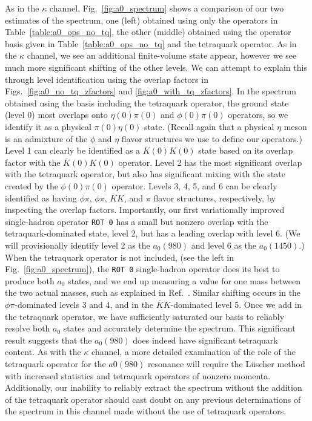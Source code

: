 As in the $\kappa$ channel, Fig.~\ref{fig:a0_spectrum} shows a comparison of our two estimates of the spectrum, one (left) obtained using only the operators in Table~\ref{table:a0_ops_no_tq}, the other (middle) obtained using the operator basis given in Table~\ref{table:a0_ops_no_tq} and the tetraquark operator. As in the $\kappa$ channel, we see an additional finite-volume state appear, however we see much more significant shifting of the other levels. We can attempt to explain this through level identification using the overlap factors in Figs.~\ref{fig:a0_no_tq_zfactors} and \ref{fig:a0_with_tq_zfactors}. In the spectrum obtained using the basis including the tetraquark operator, the ground state (level 0) most overlaps onto $\eta(0)\pi(0)$ and $\phi(0)\pi(0)$ operators, so we identify it as a physical $\pi(0)\eta(0)$ state. (Recall again that a physical $\eta$ meson is an admixture of the $\phi$ and $\eta$ flavor structures we use to define our operators.) Level 1 can clearly be identified as a $\overline K(0) K(0)$ state based on its overlap factor with the $\overline K(0) K(0)$ operator. Level 2 has the most significant overlap with the tetraquark operator, but also has significant mixing with the state created by the $\phi(0)\pi(0)$ operator. Levels 3, 4, 5, and 6 can be clearly identified as having $\phi\pi$, $\phi\pi$, $\overline K K$, and $\pi$ flavor structures, respectively, by inspecting the overlap factors. Importantly, our first variationally improved single-hadron operator \verb+ROT 0+ has a small but nonzero overlap with the tetraquark-dominated state, level 2, but has a leading overlap with level 6. (We will provisionally identify level 2 as the $a_0(980)$ and level 6 as the $a_0(1450)$.) When the tetraquark operator is not included, (see the left in Fig.~\ref{fig:a0_spectrum}), the \verb+ROT 0+ single-hadron operator does its best to produce both $a_0$ states, and we end up measuring a value for one mass between the two actual masses, such as explained in Ref.~\cite{Dudek:2012xn}. Similar shifting occurs in the $\phi\pi$-dominated levels 3 and 4, and in the $\overline K K$-dominated level 5. Once we add in the tetraquark operator, we have sufficiently saturated our basis to reliably resolve both $a_0$ states and accurately determine the spectrum. This significant result suggests that the $a_0(980)$ does indeed have significant tetraquark content. As with the $\kappa$ channel, a more detailed examination of the role of the tetraquark operator for the $a0(980)$ resonance will require the L\"uscher method with increased statistics and tetraquark operators of nonzero momenta. Additionally, our inability to reliably extract the spectrum without the addition of the tetraquark operator should cast doubt on any previous determinations of the spectrum in this channel made without the use of tetraquark operators.~\cite{Dudek:2016cru}


